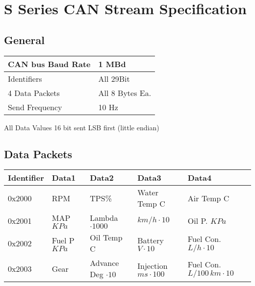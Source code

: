 \chapter{S Series CAN Stream Specification}
\label{cha:ecu_can_spec}

\section{General}

\begin{center}
\begin{tabular}{|l|l|}\hline
CAN bus Baud Rate & 1 MBd\\\hline
Identifiers & All 29Bit\\\hline
4 Data Packets & All 8 Bytes Ea.\\\hline
Send Frequency & 10 Hz\\\hline
\end{tabular}
\end{center}

All Data Values 16 bit sent LSB first (little endian)

\section{Data Packets}

\centering
\begin{tabular}{|l|l|l|l|l|}\hline
Identifier & Data1 & Data2 & Data3 & Data4 \\ \hline\hline
0x2000 & RPM & TPS\% & Water Temp C & Air Temp C \\ \hline
0x2001 & MAP $KPa$ & Lambda $\cdot 1000$ & $km/h \cdot 10$ & Oil P. $KPa$ \\ \hline
0x2002 & Fuel P $KPa$ & Oil Temp C & Battery $V \cdot 10$ & Fuel Con. $L/h \cdot 10$ \\ \hline
0x2003 & Gear & Advance Deg $\cdot 10$ & Injection $ms \cdot 100$ &  Fuel Con. $L/100\,km \cdot 10$ \\ \hline
\end{tabular}
